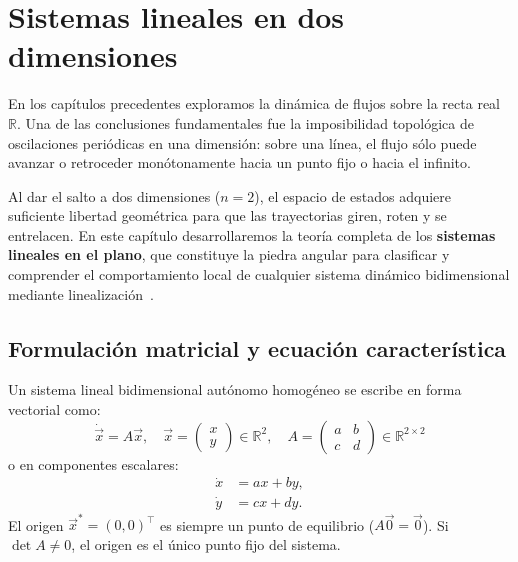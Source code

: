 \section{Sistemas lineales en dos dimensiones}
\label{sec:lineales2d}

En los capítulos precedentes exploramos la dinámica de flujos sobre la recta real $\mathbb{R}$. Una de las conclusiones fundamentales fue la imposibilidad topológica de oscilaciones periódicas en una dimensión: sobre una línea, el flujo sólo puede avanzar o retroceder monótonamente hacia un punto fijo o hacia el infinito.

Al dar el salto a dos dimensiones ($n = 2$), el espacio de estados adquiere suficiente libertad geométrica para que las trayectorias giren, roten y se entrelacen. En este capítulo desarrollaremos la teoría completa de los \textbf{sistemas lineales en el plano}, que constituye la piedra angular para clasificar y comprender el comportamiento local de cualquier sistema dinámico bidimensional mediante linealización~\cite{strogatz2015,edelstein2007}.

\subsection{Formulación matricial y ecuación característica}

Un sistema lineal bidimensional autónomo homogéneo se escribe en forma vectorial como:
\begin{equation}
    \dot{\vec{x}} = A \vec{x}, \quad \vec{x} = \begin{pmatrix} x \\ y \end{pmatrix} \in \mathbb{R}^2, \quad A = \begin{pmatrix} a & b \\ c & d \end{pmatrix} \in \mathbb{R}^{2\times 2}
    \label{eq:sistema_lineal_2d}
\end{equation}
o en componentes escalares:
\begin{equation}
\begin{aligned}
    \dot{x} &= ax + by, \\
    \dot{y} &= cx + dy.
\end{aligned}
\end{equation}
El origen $\vec{x}^* = (0,0)^\top$ es siempre un punto de equilibrio ($A\vec{0} = \vec{0}$). Si $\det A \neq 0$, el origen es el único punto fijo del sistema.

